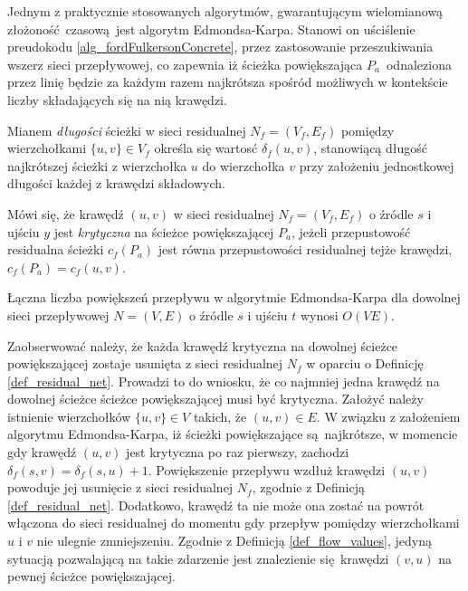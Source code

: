 \par{
  Jednym z praktycznie stosowanych algorytmów, gwarantującym wielomianową złożoność czasową jest algorytm Edmondsa-Karpa.
  Stanowi on uściślenie preudokodu \ref{alg_fordFulkersonConcrete}, przez zastosowanie przeszukiwania wszerz sieci przepływowej, co zapewnia iż ścieżka powiększająca $P_a$ odnaleziona przez linię  będzie za każdym razem najkrótsza spośród możliwych w kontekście liczby składających się na nią krawędzi.
  \begin{definition}
    Mianem \emph{długości} ścieżki w sieci residualnej $N_f=(V_f, E_f)$ pomiędzy wierzchołkami $\{u, v\} \in V_f$ określa się wartosć $\delta_f(u, v)$, stanowiącą długość najkrótszej ścieżki z wierzchołka $u$ do wierzchołka $v$ przy założeniu jednostkowej długości każdej z krawędzi składowych.
  \end{definition}
  \begin{definition}
    Mówi się, że krawędź $(u, v)$ w sieci residualnej $N_f=(V_f, E_f)$ o źródle $s$ i ujściu $y$ jest \emph{krytyczna} na ścieżce powiększającej $P_a$, jeżeli przepustowość residualna ścieżki $c_f(P_a)$ jest równa przepustowości residualnej tejże krawędzi, $c_f(P_a)=c_f(u, v)$.
  \end{definition}
  \begin{theorem}
    Łączna liczba powiększeń przepływu w algorytmie Edmondsa-Karpa dla dowolnej sieci przepływowej $N=(V, E)$ o źródle $s$ i ujściu $t$ wynosi $O(VE)$.
  \end{theorem}
  \begin{bproof}
    Zaobserwować należy, że każda krawędź krytyczna na dowolnej ścieżce powiększającej zostaje usunięta z sieci residualnej $N_f$ w oparciu o Definicję \ref{def_residual_net}.
    Prowadzi to do wniosku, że co najmniej jedna krawędź na dowolnej ścieżce ścieżce powiększającej musi być krytyczna.
    Założyć należy istnienie wierzchołków $\{u, v\} \in V$ takich, że $(u, v) \in E$.
    W związku z założeniem algorytmu Edmondsa-Karpa, iż ścieżki powiększające są najkrótsze, w momencie gdy krawędź $(u, v)$ jest krytyczna po raz pierwszy, zachodzi $\delta_f(s, v)=\delta_f(s, u)+1$.
    Powiększenie przepływu wzdłuż krawędzi $(u, v)$ powoduje jej usunięcie z sieci residualnej $N_f$, zgodnie z Definicją \ref{def_residual_net}.
    Dodatkowo, krawędź ta nie może ona zostać na powrót włączona do sieci residualnej do momentu gdy przepływ pomiędzy wierzchołkami $u$ i $v$ nie ulegnie zmniejszeniu.
    Zgodnie z Definicją \ref{def_flow_values}, jedyną sytuacją pozwalającą na takie zdarzenie jest znalezienie się krawędzi $(v, u)$ na pewnej ścieżce powiększającej.

\end{bproof}}
